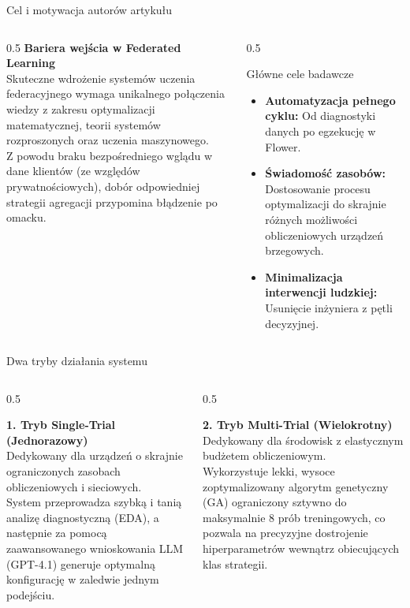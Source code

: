 \documentclass[9pt,aspectratio=169]{beamer}
\begin{document}
\begin{frame}{Cel i motywacja autorów artykułu}
\begin{columns}[T]
\begin{column}{0.5\textwidth}
\textbf{Bariera wejścia w Federated Learning}\\[4pt]
Skuteczne wdrożenie systemów uczenia federacyjnego wymaga unikalnego połączenia wiedzy z zakresu optymalizacji matematycznej, teorii systemów rozproszonych oraz uczenia maszynowego.\\[6pt]
Z powodu braku bezpośredniego wglądu w dane klientów (ze względów prywatnościowych), dobór odpowiedniej strategii agregacji przypomina błądzenie po omacku.
\end{column}
\begin{column}{0.5\textwidth}
\begin{infobox}{Główne cele badawcze}
\begin{itemize}\footnotesize
\item \textbf{Automatyzacja pełnego cyklu:} Od diagnostyki danych po egzekucję w Flower.
\item \textbf{Świadomość zasobów:} Dostosowanie procesu optymalizacji do skrajnie różnych możliwości obliczeniowych urządzeń brzegowych.
\item \textbf{Minimalizacja interwencji ludzkiej:} Usunięcie inżyniera z pętli decyzyjnej.
\end{itemize}
\end{infobox}
\end{column}
\end{columns}
\end{frame}

\begin{frame}{Dwa tryby działania systemu}
\begin{columns}[T]
\begin{column}{0.5\textwidth}
\begin{cardpurple}
\textbf{1. Tryb Single-Trial (Jednorazowy)}\\[6pt]
\footnotesize Dedykowany dla urządzeń o skrajnie ograniczonych zasobach obliczeniowych i sieciowych.\\[4pt]
System przeprowadza szybką i tanią analizę diagnostyczną (EDA), a następnie za pomocą zaawansowanego wnioskowania LLM (GPT-4.1) generuje optymalną konfigurację w zaledwie jednym podejściu.
\end{cardpurple}
\end{column}
\begin{column}{0.5\textwidth}
\begin{cardgreen}
\textbf{2. Tryb Multi-Trial (Wielokrotny)}\\[6pt]
\footnotesize Dedykowany dla środowisk z elastycznym budżetem obliczeniowym.\\[4pt]
Wykorzystuje lekki, wysoce zoptymalizowany algorytm genetyczny (GA) ograniczony sztywno do maksymalnie 8 prób treningowych, co pozwala na precyzyjne dostrojenie hiperparametrów wewnątrz obiecujących klas strategii.
\end{cardgreen}
\end{column}
\end{columns}
\end{frame}
\end{document}

